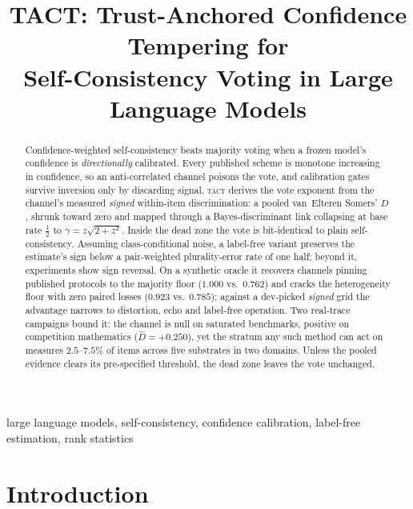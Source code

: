\documentclass[conference]{IEEEtran}
\newcommand{\Dhat}{\widehat{D}}
\newcommand{\TACT}{\textsc{tact}}
\begin{document}
\title{TACT: Trust-Anchored Confidence Tempering for\\ Self-Consistency Voting in Large Language Models}

\author{
}

\maketitle

\begin{abstract}
Confidence-weighted self-consistency beats majority voting when a frozen
model's confidence is \emph{directionally} calibrated. Every published scheme is monotone increasing in confidence, so an
anti-correlated channel poisons the vote, and calibration gates survive
inversion only by discarding signal. \TACT{} derives the vote exponent from the channel's measured
\emph{signed} within-item discrimination: a pooled
van~Elteren Somers' $D$, shrunk toward zero and mapped through a
Bayes-discriminant link collapsing at base rate $\tfrac12$ to
$\gamma=z\sqrt{2+z^2}$. Inside the dead zone the vote is
bit-identical to plain self-consistency. Assuming class-conditional noise, a label-free variant preserves the estimate's sign below a
pair-weighted plurality-error rate of one half; beyond it,
experiments show sign reversal. On a synthetic oracle it recovers channels pinning published protocols to
the majority floor ($1.000$ vs.\ $0.762$) and cracks the
heterogeneity floor with zero paired losses ($0.923$ vs.\ $0.785$); against a
dev-picked \emph{signed} grid the advantage narrows to distortion, echo and
label-free operation. Two real-trace campaigns bound it: the channel is null on saturated
benchmarks, positive on competition mathematics ($\Dhat=+0.250$), yet the
stratum any such method can act on measures $2.5$--$7.5\%$ of items across five
substrates in two domains. Unless the pooled evidence clears its pre-specified threshold, the dead zone
leaves the vote unchanged.
\end{abstract}

\begin{IEEEkeywords}
large language models, self-consistency, confidence calibration, label-free estimation, rank statistics
\end{IEEEkeywords}

\section{Introduction}
\end{document}
